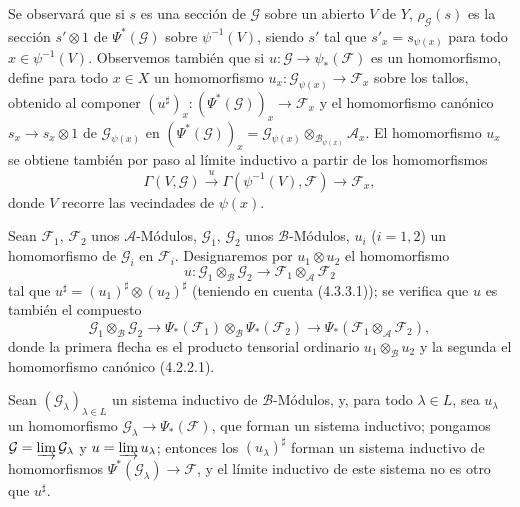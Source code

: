 \begin{env}[4.4.3]
Se observará que si $s$ es una sección de $\mathcal{G}$ sobre un abierto
$V$ de $Y$, $\rho_{\mathcal{G}}(s)$ es la sección $s'\otimes1$ de
$\Psi^*(\mathcal{G})$ sobre $\psi^{-1}(V)$, siendo $s'$ tal que
$s'_x=s_{\psi(x)}$ para todo $x\in\psi^{-1}(V)$. Observemos también que si
$u:\mathcal{G}\to\psi_*(\mathcal{F})$ es un homomorfismo, define para
todo $x\in X$ un homomorfismo
$u_x:\mathcal{G}_{\psi(x)}\to\mathcal{F}_x$ sobre los tallos, obtenido al
componer
$(u^\sharp)_x:(\Psi^*(\mathcal{G}))_x\to\mathcal{F}_x$ y el homomorfismo
canónico $s_x\to s_x\otimes1$ de $\mathcal{G}_{\psi(x)}$ en
$(\Psi^*(\mathcal{G}))_x
=\mathcal{G}_{\psi(x)}\otimes_{\mathcal{B}_{\psi(x)}}\mathcal{A}_x$.
El homomorfismo $u_x$ se obtiene también por paso al límite inductivo a
partir de los homomorfismos
\[
  \Gamma(V,\mathcal{G})\xrightarrow{u}
  \Gamma(\psi^{-1}(V),\mathcal{F})\longrightarrow\mathcal{F}_x,
\]
donde $V$ recorre las vecindades de $\psi(x)$.
\end{env}

\begin{env}[4.4.4]
\label{0.4.4.4-fr}
Sean $\mathcal{F}_1$, $\mathcal{F}_2$ unos $\mathcal{A}$-Módulos,
$\mathcal{G}_1$, $\mathcal{G}_2$ unos $\mathcal{B}$-Módulos, $u_i$ ($i=1,2$)
un homomorfismo de $\mathcal{G}_i$ en $\mathcal{F}_i$. Designaremos por
$u_1\otimes u_2$ el homomorfismo
\[
  u:\mathcal{G}_1\otimes_{\mathcal{B}}\mathcal{G}_2
  \longrightarrow
  \mathcal{F}_1\otimes_{\mathcal{A}}\mathcal{F}_2
\]
tal que $u^\sharp=(u_1)^\sharp\otimes(u_2)^\sharp$ (teniendo en cuenta
(4.3.3.1)); se verifica que $u$ es también el compuesto
\[
  \mathcal{G}_1\otimes_{\mathcal{B}}\mathcal{G}_2
  \longrightarrow
  \Psi_*(\mathcal{F}_1)\otimes_{\mathcal{B}}\Psi_*(\mathcal{F}_2)
  \longrightarrow
  \Psi_*(\mathcal{F}_1\otimes_{\mathcal{A}}\mathcal{F}_2),
\]
donde la primera flecha es el producto tensorial ordinario
$u_1\otimes_{\mathcal{B}}u_2$ y la segunda el homomorfismo canónico
(4.2.2.1).
\end{env}

\begin{env}[4.4.5]
\label{0.4.4.5-fr}
Sean $(\mathcal{G}_\lambda)_{\lambda\in L}$ un sistema inductivo de
$\mathcal{B}$-Módulos, y, para todo $\lambda\in L$, sea $u_\lambda$ un
homomorfismo $\mathcal{G}_\lambda\to\Psi_*(\mathcal{F})$, que forman un sistema
inductivo; pongamos
$\mathcal{G}=\varinjlim\mathcal{G}_\lambda$ y
$u=\varinjlim u_\lambda$; entonces los $(u_\lambda)^\sharp$ forman un sistema
inductivo de homomorfismos $\Psi^*(\mathcal{G}_\lambda)\to\mathcal{F}$, y el
límite inductivo de este sistema no es otro que $u^\sharp$.
\end{env}

